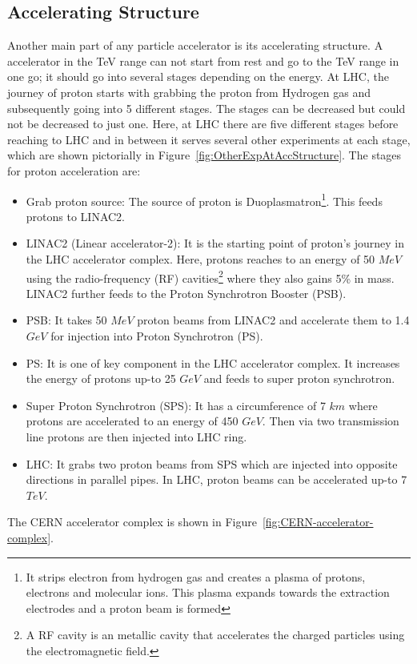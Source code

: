 \subsection{Accelerating Structure} %
\label{sub:accelerating_structure}

Another main part of any particle accelerator is its accelerating structure. A accelerator in the TeV range can not start from rest and go to the TeV range in one go; it should go into several stages depending on the energy. At LHC, the journey of proton starts with grabbing the proton from Hydrogen gas and subsequently going into 5 different stages. The stages can be decreased but could not be decreased to just one. Here, at LHC there are five different stages before reaching to LHC and in between it serves several other experiments at each stage, which are shown pictorially in Figure~\ref{fig:OtherExpAtAccStructure}. The stages for proton acceleration are:
\begin{itemize}
    \item Grab proton source: The source of proton is Duoplasmatron\footnote{It strips electron from hydrogen gas and creates a plasma of protons, electrons and molecular ions. This plasma expands towards the extraction electrodes and a proton beam is formed}\cite{LHC-tdr-vol3}. This feeds protons to LINAC2.
    \item LINAC2 (Linear accelerator-2): It is the starting point of proton's journey in the LHC accelerator complex. Here, protons reaches to an energy of 50 $MeV$ using the radio-frequency (RF) cavities\footnote{A RF cavity is an metallic cavity that accelerates the charged particles using the electromagnetic field.} where they also gains 5\% in mass. LINAC2 further feeds to the Proton Synchrotron Booster (PSB).
    \item PSB: It takes 50 $MeV$ proton beams from LINAC2 and accelerate them to 1.4 $GeV$ for injection into Proton Synchrotron (PS).
    \item PS: It is one of key component in the LHC accelerator complex. It increases the energy of protons up-to 25 $GeV$ and feeds to super proton synchrotron.
    \item Super Proton Synchrotron (SPS): It has a circumference of 7 $km$ where protons are accelerated to an energy of 450 $GeV$. Then via two transmission line protons are then injected into LHC ring.
    \item LHC: It grabs two proton beams from SPS which are injected into opposite directions in parallel pipes. In LHC, proton beams can be accelerated up-to 7 $TeV$.
\end{itemize}
The CERN accelerator complex is shown in Figure~\ref{fig:CERN-accelerator-complex}.  

